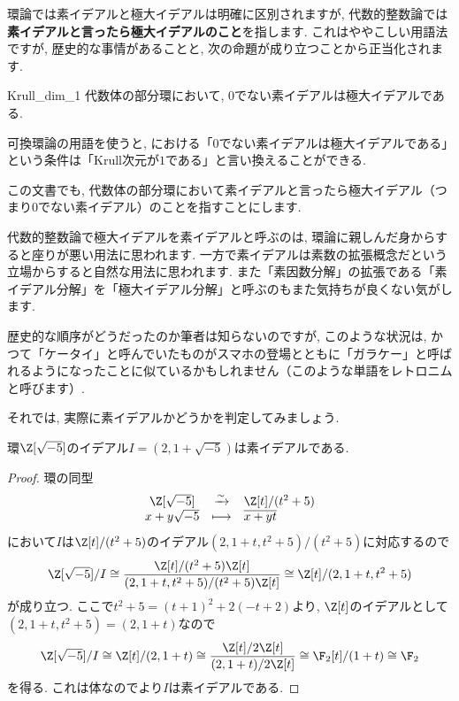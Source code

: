 \documentclass[11pt,b5paper,oneside,titlepage,lualatex]{ltjsreport}
\begin{document}
環論では素イデアルと極大イデアルは明確に区別されますが, 代数的整数論では\textbf{素イデアルと言ったら極大イデアルのこと}を指します. 
これはややこしい用語法ですが, 歴史的な事情があることと, 次の命題が成り立つことから正当化されます. 

\begin{prop}{}{Krull_dim_1}
	代数体の部分環において, $ 0 $でない素イデアルは極大イデアルである. 
\end{prop}

\begin{rem}{}{}
	可換環論の用語を使うと, における「$ 0 $でない素イデアルは極大イデアルである」という条件は「Krull次元が$ 1 $である」と言い換えることができる. 
\end{rem}

この文書でも, 代数体の部分環において素イデアルと言ったら極大イデアル（つまり$ 0 $でない素イデアル）のことを指すことにします. 

\begin{ringnote}
	代数的整数論で極大イデアルを素イデアルと呼ぶのは, 環論に親しんだ身からすると座りが悪い用法に思われます. 
	一方で素イデアルは素数の拡張概念だという立場からすると自然な用法に思われます. 
	また「素因数分解」の拡張である「素イデアル分解」を「極大イデアル分解」と呼ぶのもまた気持ちが良くない気がします. 
	
	歴史的な順序がどうだったのか筆者は知らないのですが, このような状況は, かつて「ケータイ」と呼んでいたものがスマホの登場とともに「ガラケー」と呼ばれるようになったことに似ているかもしれません（このような単語をレトロニムと呼びます）. 
\end{ringnote}

それでは, 実際に素イデアルかどうかを判定してみましょう. 

\begin{prop}{}{}
	環$ \Z[\sqrt{-5}] $のイデアル$ I = (2, 1 + \sqrt{-5}) $は素イデアルである. 
\end{prop}

\begin{proof}
	環の同型
	\[
	\begin{array}{ccl}
		\Z[\sqrt{-5}] & \xrightarrow{\sim} & \Z[t]/(t^2 + 5) \\
		x + y\sqrt{-5} & \longmapsto & \overline{x + yt}
	\end{array}
	\]
	において$ I $は$ \Z[t]/(t^2 + 5) $のイデアル$ (2, 1+t, t^2+5)/(t^2 + 5) $に対応するので
	\[
	\Z[\sqrt{-5}]/I \cong \frac{\Z[t]/(t^2 + 5) \Z[t]}{(2, 1+t, t^2+5)/(t^2 + 5) \Z[t]}
	\cong \Z[t]/(2, 1+t, t^2+5)
	\]
	が成り立つ. 
	ここで$ t^2 + 5 = (t+1)^2 + 2(-t + 2) $より, $ \Z[t] $のイデアルとして$ (2, 1+t, t^2+5) = (2, 1+t) $なので
	\[
	\Z[\sqrt{-5}]/I \cong \Z[t]/(2, 1+t)
	\cong \frac{\Z[t]/2\Z[t]}{(2, 1+t)/2\Z[t]}
	\cong \F_2[t]/(1+t)
	\cong \F_2
	\]
	を得る. 
	これは体なのでより$ I $は素イデアルである. 
\end{proof}
\end{document}
